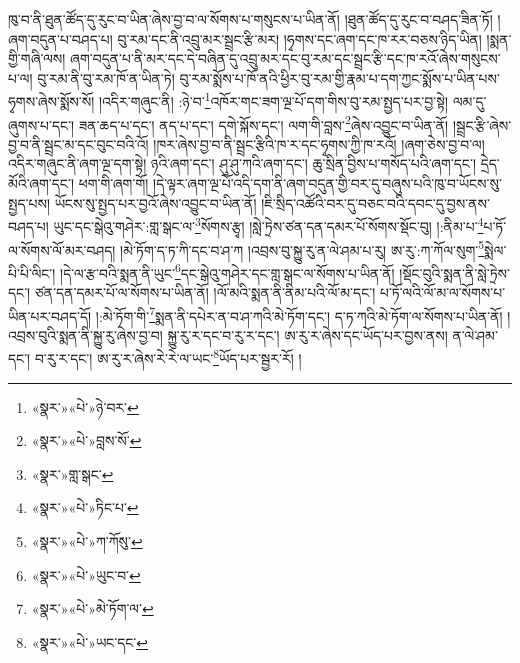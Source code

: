 ཁུ་བ་ནི་ཐུན་ཚོད་དུ་རུང་བ་ཡིན་ཞེས་བྱ་བ་ལ་སོགས་པ་གསུངས་པ་ཡིན་ནོ། །ཐུན་ཚོད་དུ་རུང་བ་བཤད་ཟིན་ཏོ། །ཞག་བདུན་པ་བཤད་པ། བུ་རམ་དང་ནི་འབྲུ་མར་སྦྲང་རྩི་མར། །ཧྭགས་དང་ཞག་དང་ཁ་རར་བཅས་ཉིད་ཡིན། །སྨན་གྱི་གཞི་ལས། ཞག་བདུན་པ་ནི་མར་དང་དེ་བཞིན་དུ་འབྲུ་མར་དང་བུ་རམ་དང་སྦྲང་རྩི་དང་ཁ་རའོ་ཞེས་གསུངས་པ་ལ། བུ་རམ་ནི་བུ་རམ་ཁོ་ན་ཡིན་ཏེ། བུ་རམ་སྨོས་པ་ཁོ་ནའི་ཕྱིར་བུ་རམ་གྱི་རྣམ་པ་དག་ཀྱང་སྨོས་པ་ཡིན་པས་ཧྭགས་ཞེས་སྨོས་སོ། །འདིར་གཞུང་ནི། :ཉེ་བ་\footnote{«སྣར་»«པེ་»ཉེ་བར་}འཁོར་གང་ཟག་ལྔ་པོ་དག་གིས་བུ་རམ་སྤྱད་པར་བྱ་སྟེ། ལམ་དུ་ཞུགས་པ་དང་། ཟན་ཆད་པ་དང་། ནད་པ་དང་། དགེ་སྐོས་དང་། ལག་གི་བླས་\footnote{«སྣར་»«པེ་»བླས་སོ་}ཞེས་འབྱུང་བ་ཡིན་ནོ། །སྦྲང་རྩི་ཞེས་བྱ་བ་ནི་སྦྲང་མ་དང་བུང་བའི་འོ། །ཁར་ཞེས་བྱ་བ་ནི་སྦྲང་རྩིའི་ཁ་ར་དང་ཧྭགས་ཀྱི་ཁ་རའོ། །ཞག་ཅེས་བྱ་བ་ལ། འདིར་གཞུང་ནི་ཞག་ལྔ་དག་སྟེ། ཉའི་ཞག་དང་། ཤུ་ཤུ་ཀའི་ཞག་དང་། ཆུ་སྲིན་བྱིས་པ་གསོད་པའི་ཞག་དང་། དྲེད་མོའི་ཞག་དང་། ཕག་གི་ཞག་གོ། །དེ་ལྟར་ཞག་ལྔ་པོ་འདི་དག་ནི་ཞག་བདུན་གྱི་བར་དུ་བཞུས་པའི་ཁུ་བ་ཡོངས་སུ་སྤྱད་པས། ཡོངས་སུ་སྤྱད་པར་བྱའོ་ཞེས་འབྱུང་བ་ཡིན་ནོ། །ཇི་སྲིད་འཚོའི་བར་དུ་བཅང་བའི་དབང་དུ་བྱས་ནས་བཤད་པ། ཡུང་དང་སྒེའུ་གཤེར་:གླ་སྒང་ལ་\footnote{«སྣར་»གླ་སྒང་}སོགས་རྩྭ། །སླེ་ཏྲེས་ཙན་དན་དམར་པོ་སོགས་སྡོང་བུ། །:ནིམ་པ་\footnote{«སྣར་»«པེ་»ཏིང་པ་}པ་ཏོ་ལ་སོགས་ལོ་མར་བཤད། །མེ་ཏོག་ད་ཏ་ཀི་དང་བ་ཤ་ཀ །འབྲས་བུ་སྐྱུ་རུ་ན་ལེ་ཤམ་པ་རུ། ཨ་རུ་:ཀ་ཀོལ་སུག་\footnote{«སྣར་»«པེ་»ཀ་ཀོསུ་}སྨེལ་པི་པི་ལིང་། །དེ་ལ་རྩ་བའི་སྨན་ནི་ཡུང་\footnote{«སྣར་»«པེ་»ཡུང་བ་}དང་སྒེའུ་གཤེར་དང་གླ་སྒང་ལ་སོགས་པ་ཡིན་ནོ། །སྡོང་བུའི་སྨན་ནི་སླེ་ཏྲེས་དང་། ཙན་དན་དམར་པོ་ལ་སོགས་པ་ཡིན་ནོ། །ལོ་མའི་སྨན་ནི་ནིམ་པའི་ལོ་མ་དང་། པ་ཏོ་ལའི་ལོ་མ་ལ་སོགས་པ་ཡིན་པར་བཤད་དོ། །:མེ་ཏོག་གི་\footnote{«སྣར་»«པེ་»མེ་ཏོག་ལ་}སྨན་ནི་དཔེར་ན་བ་ཤ་ཀའི་མེ་ཏོག་དང་། ད་ཏ་ཀའི་མེ་ཏོག་ལ་སོགས་པ་ཡིན་ནོ། །འབྲས་བུའི་སྨན་ནི་སྐྱུ་རུ་ཞེས་བྱ་བ། སྐྱུ་རུ་ར་དང་བ་རུ་ར་དང་། ཨ་རུ་ར་ཞེས་དང་ཡོད་པར་བྱས་ནས། ན་ལེ་ཤམ་དང་། བ་རུ་ར་དང་། ཨ་རུ་ར་ཞེས་རེ་རེ་ལ་ཡང་\footnote{«སྣར་»«པེ་»ཡང་དང་}ཡོད་པར་སྦྱར་རོ། །

